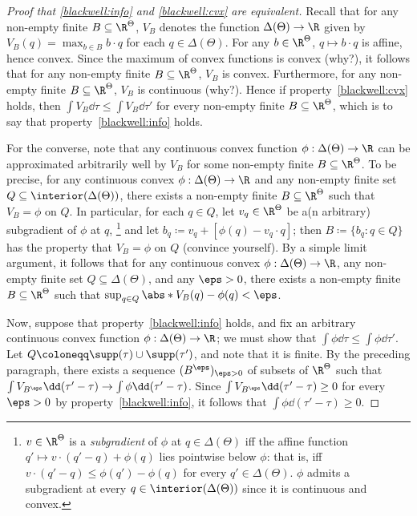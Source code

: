 \begin{proof}[Proof that \ref{blackwell:info} and \ref{blackwell:cvx} are equivalent]
	Recall that for any non-empty finite $B \subseteq \R^\Theta$, $V_B$ denotes the function $\Delta(\Theta) \to \R$ given by $V_B(q) = \max_{b \in B} b \cdot q$ for each $q \in \Delta(\Theta)$. For any $b \in \R^\Theta$, $q \mapsto b \cdot q$ is affine, hence convex. Since the maximum of convex functions is convex (why?), it follows that for any non-empty finite $B \subseteq \R^\Theta$, $V_B$ is convex. Furthermore, for any non-empty finite $B \subseteq \R^\Theta$, $V_B$ is continuous (why?). Hence if property~\ref{blackwell:cvx} holds, then $\int V_B \dd \tau \leq \int V_B \dd \tau'$ for every non-empty finite $B \subseteq \R^\Theta$, which is to say that property~\ref{blackwell:info} holds.

	For the converse, note that any continuous convex function $\phi : \Delta(\Theta) \to \R$ can be approximated arbitrarily well by $V_B$ for some non-empty finite $B \subseteq \R^\Theta$. To be precise, for any continuous convex $\phi : \Delta(\Theta) \to \R$ and any non-empty finite set $Q \subseteq \interior(\Delta(\Theta))$, there exists a non-empty finite $B \subseteq \R^\Theta$ such that $V_B=\phi$ on $Q$. In particular, for each $q \in Q$, let $v_q \in \R^\Theta$ be a(n arbitrary) subgradient of $\phi$ at $q$,%
		\footnote{$v \in \R^\Theta$ is a \emph{subgradient} of $\phi$ at $q \in \Delta(\Theta)$ iff the affine function $q' \mapsto v \cdot (q'-q) + \phi(q)$ lies pointwise below $\phi$: that is, iff $v \cdot (q'-q) \leq \phi(q')-\phi(q)$ for every $q' \in \Delta(\Theta)$. $\phi$ admits a subgradient at every $q \in \interior(\Delta(\Theta))$ since it is continuous and convex.}
	and let $b_q \coloneqq v_q + [ \phi(q) - v_q \cdot q ]$; then $B \coloneqq \{ b_q : q \in Q \}$ has the property that $V_B=\phi$ on $Q$ (convince yourself). By a simple limit argument, it follows that for any continuous convex $\phi : \Delta(\Theta) \to \R$, any non-empty finite set $Q \subseteq \Delta(\Theta)$, and any $\eps>0$, there exists a non-empty finite $B \subseteq \R^\Theta$ such that $\sup_{q \in Q} \abs*{V_B(q)-\phi(q)} < \eps$.

	Now, suppose that property~\ref{blackwell:info} holds, and fix an arbitrary continuous convex function $\phi : \Delta(\Theta) \to \R$; we must show that $\int \phi \dd \tau \leq \int \phi \dd \tau'$. Let $Q \coloneqq \supp(\tau) \cup \supp(\tau')$, and note that it is finite. By the preceding paragraph, there exists a sequence $(B^\eps)_{\eps>0}$ of subsets of $\R^\Theta$ such that $\int V_{B^\eps} \dd (\tau'-\tau) \to \int \phi \dd (\tau'-\tau)$. Since $\int V_{B^\eps} \dd (\tau'-\tau) \geq 0$ for every $\eps>0$ by property~\ref{blackwell:info}, it follows that $\int \phi \dd (\tau'-\tau) \geq 0$.
\end{proof}

